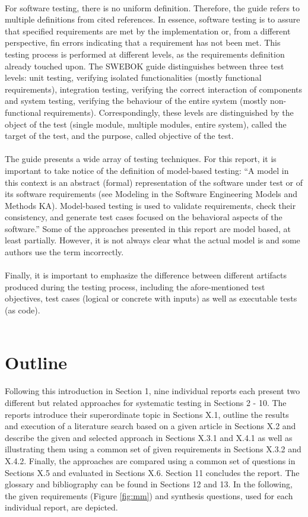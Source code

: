 \\
For software testing, there is no uniform definition. Therefore, the guide refers to multiple definitions from cited references. In essence, software testing is to assure that specified requirements are met by the implementation or, from a different perspective, fin errors indicating that a requirement has not been met. This testing process is performed at different levels, as the requirements definition already touched upon. The SWEBOK guide distinguishes between three test levels: unit testing, verifying isolated functionalities (mostly functional requirements), integration testing, verifying the correct interaction of components and system testing, verifying the behaviour of the entire system (mostly non-functional requirements). Correspondingly, these levels are distinguished by the object of the test (single module, multiple modules, entire system), called the target of the test, and the purpose, called objective of the test. \cite{SWEBOK}\\
\\
The guide presents a wide array of testing techniques. For this report, it is important to take notice of the definition of model-based testing: “A model in this context is an abstract (formal) representation of the software under test or of its software requirements (see Modeling in the Software Engineering Models and Methods KA). Model-based testing is used to validate requirements, check their consistency, and generate test cases focused on the behavioral aspects of the software.”\cite{SWEBOK} Some of the approaches presented in this report are model based, at least partially. However, it is not always clear what the actual model is and some authors use the term incorrectly. \\
\\
Finally, it is important to emphasize the difference between different artifacts produced during the testing process, including the afore-mentioned test objectives, test cases (logical or concrete with inputs) as well as executable tests (as code).\\
\\
\section{Outline}

Following this introduction in Section 1, nine individual reports each present two different but related approaches for systematic testing in Sections 2 - 10. The reports introduce their superordinate topic in Sections X.1, outline the results and execution of a literature search based on a given article in Sections X.2 and describe the given and selected approach in Sections X.3.1 and X.4.1 as well as illustrating them using a common set of given requirements in Sections X.3.2 and X.4.2. Finally, the approaches are compared using a common set of questions in Sections X.5 and evaluated in Sections X.6. Section 11 concludes the report. The glossary and bibliography can be found in Sections 12 and 13. In the following, the given requirements (Figure \ref{fig:mm}) and synthesis questions, used for each individual report, are depicted.

